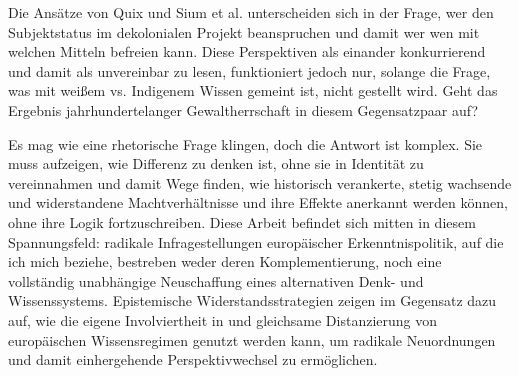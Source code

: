 \documentclass[11pt]{article}
\begin{document}
Die Ansätze von Quix und Sium et al. unterscheiden sich in der Frage, wer den
Subjektstatus im dekolonialen Projekt beanspruchen und damit wer wen mit welchen
Mitteln befreien kann. Diese Perspektiven als einander konkurrierend und damit
als unvereinbar zu lesen, funktioniert jedoch nur, solange die Frage, was mit
weißem vs. Indigenem Wissen gemeint ist, nicht gestellt wird. Geht das Ergebnis
jahrhundertelanger Gewaltherrschaft in diesem Gegensatzpaar auf?

Es mag wie eine rhetorische Frage klingen, doch die Antwort ist komplex. Sie
muss aufzeigen, \glqq wie Differenz zu denken ist, ohne sie in Identität zu
vereinnahmen \grqq \footnotemark {} 
und damit Wege finden, wie historisch verankerte, stetig
wachsende und widerstandene Machtverhältnisse und ihre Effekte anerkannt werden
können, ohne ihre Logik fortzuschreiben. Diese Arbeit befindet sich mitten in
diesem Spannungsfeld: radikale Infragestellungen europäischer Erkenntnispolitik,
auf die ich mich beziehe, bestreben weder deren Komplementierung, noch eine
vollständig unabhängige Neuschaffung eines alternativen Denk- und
Wissenssystems. Epistemische Widerstandsstrategien \footnotemark {}
zeigen im Gegensatz dazu auf, wie die eigene Involviertheit in und gleichsame Distanzierung von
europäischen Wissensregimen genutzt werden kann, um radikale Neuordnungen und
damit einhergehende Perspektivwechsel zu ermöglichen.
\end{document}
